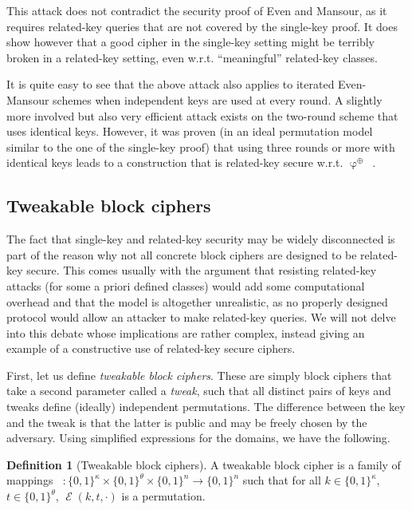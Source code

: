 \documentclass[11pt,a4paper]{article}
\theoremstyle{definition}
\newtheorem{defi}{Definition}
\DeclareMathOperator\E{\mathcal{E}}
\DeclareMathOperator\TE{\mathcal{\widetilde{E}}}
\DeclareMathOperator\rkf{\varphi}
\newcommand\msb{\{0,1\}^n}
\newcommand\ksb{\{0,1\}^\kappa}
\newcommand\tsb{\{0,1\}^\theta}
\begin{document}
This attack does not contradict the security proof of Even and Mansour, as it requires related-key queries that are not covered by the single-key proof.
It does show however that a good cipher in the single-key setting might be terribly broken in a related-key setting, even w.r.t. ``meaningful''
related-key classes.

It is quite easy to see that the above attack also applies to iterated Even-Mansour schemes when independent keys are used at every round.
A slightly more involved but also very efficient attack exists on the two-round scheme that uses identical keys. However, it was proven
(in an ideal permutation model similar to the one of the single-key proof)
that using three rounds or more with identical keys leads to a construction that is related-key secure w.r.t.
$\rkf^\oplus$~\cite{DBLP:conf/eurocrypt/CogliatiS15,DBLP:conf/fse/FarshimP15}. 

\subsection{Tweakable block ciphers}

The fact that single-key and related-key security may be widely disconnected is part of the reason why not all concrete block ciphers are designed
to be related-key secure. This comes usually with the argument that resisting related-key attacks (for some a priori defined classes)
would add some computational overhead and that the model is altogether unrealistic, as no properly designed protocol would allow
an attacker to make related-key queries. We will not delve into this debate whose implications are rather complex, instead giving
an example of a constructive use of related-key secure ciphers.

First, let us define \emph{tweakable block ciphers}. These are simply block ciphers that take a second parameter called a \emph{tweak},
such that all distinct pairs of keys and tweaks define (ideally) independent permutations. The difference between the key and the
tweak is that the latter is public and may be freely chosen by the adversary. Using simplified expressions for the domains, we have the
following.

\begin{defi}[Tweakable block ciphers]
\label{def:tbc}
A tweakable block cipher is a family of mappings $\TE : \ksb \times \tsb \times \msb \rightarrow \msb$ such that for all $k \in \ksb$,
$t \in \tsb$, $\E(k, t, \cdot)$ is a permutation.
\end{defi}
\end{document}
